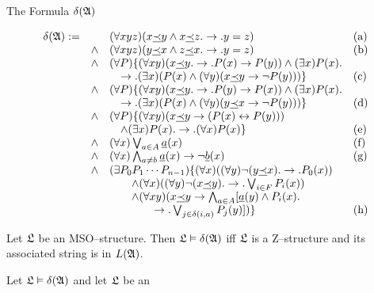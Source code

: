 \begin{table}
\caption{The Formula $\delta(\GA)$}
\index{$\delta(\GA)$}%
\label{tab:diagram}
$$\begin{array}{lll@{\quad}l}
\delta(\GA) :=
    & & (\forall xyz)(x \uli{\prec} y \und
    x \uli{\prec} z. \pf .y \doteq z)  & \mbox{\rm (a)} \\
    & \und & (\forall xyz)(y \uli{\prec} x \und
    z \uli{\prec} x. \pf .y \doteq z) & \mbox{\rm (b)} \\
    & \und & (\forall P)\{(\forall xy)(x \uli{\prec} y. \pf
        .P(x) \pf P(y)) \und (\exists x)P(x). \\ 
	& & \quad 
	\pf .  (\exists x)(P(x) \und (\forall y)(x \uli{\prec} y 
        \pf \nicht P(y)))\} & \mbox{\rm (c)} \\
    & \und & (\forall P)\{(\forall xy)(x \uli{\prec} y. \pf
        .P(y) \pf P(x)) \und (\exists x)P(x).  \\
	& & \quad 
	\pf .(\exists x)(P(x) \und (\forall y)(y \uli{\prec} x 
        \pf \nicht P(y)))\} & \mbox{\rm (d)} \\
    & \und & (\forall P)\{(\forall xy)(x \uli{\prec} y \pf
        (P(x) \dpf P(y))) \\
	& & \quad \und (\exists x)P(x). \pf. 
	(\forall x)P(x)\} &
            \mbox{\rm (e)} \\
    & \und & (\forall x)\goder_{a \in A} \uli{a}(x) &
        \mbox{\rm (f)} \\
    & \und & (\forall x)\gund_{a \neq b} \uli{a}(x) \pf \nicht
        \uli{b}(x) & \mbox{\rm (g)} \\
    & \und & (\exists P_0P_1\dotsb P_{n-1})\{(\forall x)((\forall y)\nicht(y
        \uli{\prec} x).  \pf . P_0(x)) \\
        &      & \qquad \und (\forall x)((\forall y)\nicht (x
        \uli{\prec} y).  \pf .
        \goder_{i \in F} P_i(x)) \\
        &      & \qquad \und (\forall xy)(x \uli{\prec} y \pf
        \gund_{a \in A}  [\uli{a}(y) \und P_i(x). \\
        & & \qquad\qquad \pf . \goder_{j \in \delta(i,a)} P_j(y)])\} & 
\mbox{\rm (h)}
\end{array}$$
\end{table}
\begin{lem}
Let $\mathfrak{L}$ be an MSO--structure. Then $\mathfrak{L} \vDash \delta(\mathfrak{A})$ iff 
$\mathfrak{L}$ is a Z--structure and its associated string is in $L(\mathfrak{A})$.
\end{lem}
\proofbeg
Let $\mathfrak{L} \vDash \delta(\mathfrak{A})$ and let $\mathfrak{L}$ be an
